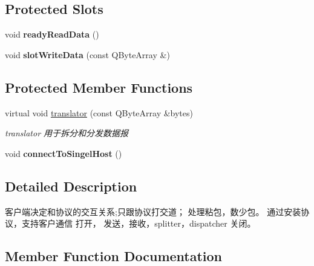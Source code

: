 \subsection*{Protected Slots}
\begin{DoxyCompactItemize}
\item 
\mbox{\label{class_q_qt_named_pipe_client_ae7567faac96841b392cfae6af811f1d2}} 
void {\bfseries ready\+Read\+Data} ()
\item 
\mbox{\label{class_q_qt_named_pipe_client_a41088fce8513dbfeea0c3db582afb233}} 
void {\bfseries slot\+Write\+Data} (const Q\+Byte\+Array \&)
\end{DoxyCompactItemize}
\subsection*{Protected Member Functions}
\begin{DoxyCompactItemize}
\item 
virtual void \mbox{\hyperlink{class_q_qt_named_pipe_client_a7387042a99d784dd90748ae68bb1be69}{translator}} (const Q\+Byte\+Array \&bytes)
\begin{DoxyCompactList}\small\item\em translator 用于拆分和分发数据报 \end{DoxyCompactList}\item 
\mbox{\label{class_q_qt_named_pipe_client_a300d1f3d277d809ff500f2e1292a329e}} 
void {\bfseries connect\+To\+Singel\+Host} ()
\end{DoxyCompactItemize}


\subsection{Detailed Description}
客户端决定和协议的交互关系;只跟协议打交道； 处理粘包，数少包。 通过安装协议，支持客户通信 打开， 发送，接收，splitter，dispatcher 关闭。 

\subsection{Member Function Documentation}
\mbox{\label{class_q_qt_named_pipe_client_a7387042a99d784dd90748ae68bb1be69}} 

